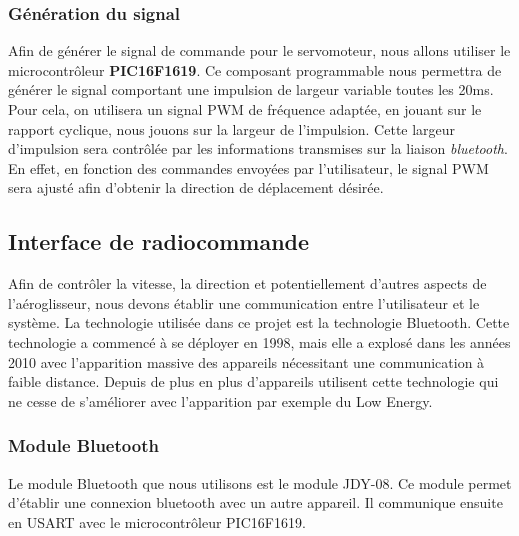 \documentclass[a4paper,12pt]{report}
\begin{document}
			\vspace{-1em}
			
			\subsubsection{Génération du signal}
			
			\vspace{-1em}
			
			Afin de générer le signal de commande pour le servomoteur, nous allons utiliser le microcontrôleur \textbf{PIC16F1619}. Ce composant programmable nous permettra de générer le signal comportant une impulsion de largeur variable toutes les 20ms. Pour cela, on utilisera un signal PWM de fréquence adaptée, en jouant sur le rapport cyclique, nous jouons sur la largeur de l'impulsion. Cette largeur d'impulsion sera contrôlée par les informations transmises sur la liaison \textit{bluetooth}. En effet, en fonction des commandes envoyées par l'utilisateur, le signal PWM sera ajusté afin d'obtenir la direction de déplacement désirée.
			
		\vspace{-1em}
			
		\subsection{Interface de radiocommande}
			Afin de contrôler la vitesse, la direction et potentiellement d'autres aspects de l'aéroglisseur, nous devons établir une communication entre l'utilisateur et le système. La technologie utilisée dans ce projet est la technologie Bluetooth. Cette technologie a commencé à se déployer en 1998, mais elle a explosé dans les années 2010 avec l'apparition massive des appareils nécessitant une communication à faible distance. Depuis de plus en plus d'appareils utilisent cette technologie qui ne cesse de s'améliorer avec l'apparition par exemple du Low Energy.
			
			\vspace{-1em}
			
			\subsubsection{Module Bluetooth}
			
			\vspace{-1em}
			
			Le module Bluetooth que nous utilisons est le module JDY-08. Ce module permet d'établir une connexion bluetooth avec un autre appareil. Il communique ensuite en USART avec le microcontrôleur PIC16F1619.
			
\end{document}
